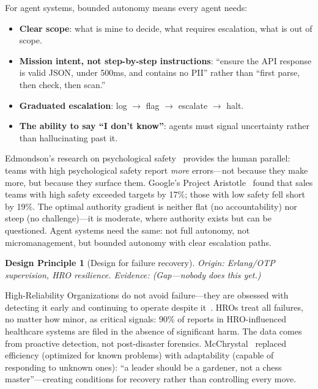 \documentclass{article}
\newtheorem{principle}{Design Principle}
\begin{document}
For agent systems, bounded autonomy means every agent needs:
\begin{itemize}[nosep]
  \item \textbf{Clear scope}: what is mine to decide, what requires escalation, what is
    out of scope.
  \item \textbf{Mission intent, not step-by-step instructions}: ``ensure the API response
    is valid JSON, under 500ms, and contains no PII'' rather than ``first parse, then
    check, then scan.''
  \item \textbf{Graduated escalation}: log $\to$ flag $\to$ escalate $\to$ halt.
  \item \textbf{The ability to say ``I don't know''}: agents must signal uncertainty
    rather than hallucinating past it.
\end{itemize}

\noindent
Edmondson's research on psychological safety~\citep{edmondson1999psychological} provides
the human parallel: teams with high psychological safety report \emph{more} errors---not
because they make more, but because they surface them. Google's Project
Aristotle~\citep{duhigg2016google} found that sales teams with high safety exceeded
targets by 17\%; those with low safety fell short by 19\%. The optimal authority gradient
is neither flat (no accountability) nor steep (no challenge)---it is moderate, where
authority exists but can be questioned. Agent systems need the same: not full autonomy,
not micromanagement, but bounded autonomy with clear escalation paths.

\begin{principle}[Design for failure recovery]
\emph{Origin}: Erlang/OTP supervision, HRO resilience.
\emph{Evidence}: \emph{(Gap---nobody does this yet.)}
\end{principle}

High-Reliability Organizations do not avoid failure---they are obsessed with detecting it
early and continuing to operate despite it~\citep{weick2015managing}. HROs treat all
failures, no matter how minor, as critical signals: 90\% of reports in HRO-influenced
healthcare systems are filed in the absence of significant harm. The data comes from
proactive detection, not post-disaster forensics. McChrystal~\citep{mcchrystal2015team}
replaced efficiency (optimized for known problems) with adaptability (capable of
responding to unknown ones): ``a leader should be a gardener, not a chess
master''---creating conditions for recovery rather than controlling every move.
\end{document}
